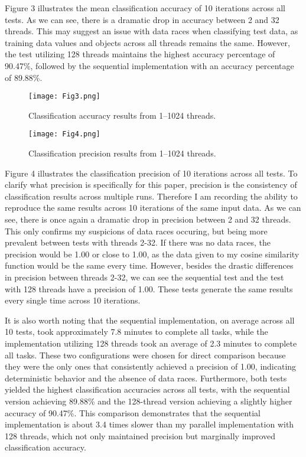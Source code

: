 \documentclass[conference]{IEEEtran}
\begin{document}
Figure 3 illustrates the mean classification accuracy of 10 iterations across all tests. As we can see, there is a dramatic drop in accuracy between 2 and 32 threads. This may suggest an issue with data races when classifying test data, as training data values and objects across all threads remains the same. However, the test utilizing 128 threads maintains the highest accuracy percentage of 90.47\%, followed by the sequential implementation with an accuracy percentage of 89.88\%. 

\begin{figure}[htbp]
\centerline{\texttt{[image: Fig3.png]}}
\caption{Classification accuracy results from 1--1024 threads.}
\label{fig}
\end{figure}

\begin{figure}[htbp]
\centerline{\texttt{[image: Fig4.png]}}
\caption{Classification precision results from 1--1024 threads.}
\label{fig}
\end{figure}

Figure 4 illustrates the classification precision of 10 iterations across all tests. To clarify what precision is specifically for this paper, precision is the consistency of classification results across multiple runs. Therefore I am recording the ability to reproduce the same results across 10 iterations of the same input data. As we can see, there is once again a dramatic drop in precision between 2 and 32 threads. This only confirms my suspicions of data races occuring, but being more prevalent between tests with threads 2-32. If there was no data races, the precision would be 1.00 or close to 1.00, as the data given to my cosine similarity function would be the same every time. However, besides the drastic differences in precision between threads 2-32, we can see the sequential test and the test with 128 threads have a precision of 1.00. These tests generate the same results every single time across 10 iterations.

It is also worth noting that the sequential implementation, on average across all 10 tests, took approximately 7.8 minutes to complete all tasks, while the implementation utilizing 128 threads took an average of 2.3 minutes to complete all tasks. These two configurations were chosen for direct comparison because they were the only ones that consistently achieved a precision of 1.00, indicating deterministic behavior and the absence of data races. Furthermore, both tests yielded the highest classification accuracies across all tests, with the sequential version achieving 89.88\% and the 128-thread version achieving a slightly higher accuracy of 90.47\%. This comparison demonstrates that the sequential implementation is about 3.4 times slower than my parallel implementation with 128 threads, which not only maintained precision but marginally improved classification accuracy.
\end{document}
